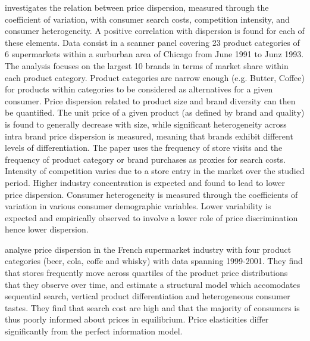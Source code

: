 \documentclass[english]{article}
\begin{document}
\cite{ZHA06} investigates the relation between price dispersion, measured through the coefficient of variation, with consumer search costs, competition intensity, and consumer heterogeneity. A positive correlation with dispersion is found for each of these elements. Data consist in a scanner panel covering 23 product categories of 6 supermarkets within a surburban area of Chicago from June 1991 to Junz 1993. The analysis focuses on the largest 10 brands in terms of market share within each product category. Product categories are narrow enough (e.g. Butter, Coffee) for products within categories to be considered as alternatives for a given consumer. Price dispersion related to product size and brand diversity can then be quantified. The unit price of a given product (as defined by brand and quality) is found to generally decrease with size, while significant heterogeneity across intra brand price dispersion is measured, meaning that brands exhibit different levels of differentiation. The paper uses the frequency of store visits and the frequency of product category or brand purchases as proxies for search costs. Intensity of competition varies due to a store entry in the market over the studied period. Higher industry concentration is expected and found to lead to lower price dispersion. Consumer heterogeneity is measured through the coefficients of variation in various consumer demographic variables. Lower variability is expected and empirically observed to involve a lower role of price discrimination hence lower dispersion.

\cite{PER15} analyse price dispersion in the French supermarket industry with four product categories (beer, cola, coffe and whisky) with data spanning 1999-2001. They find that stores frequently move across quartiles of the product price distributions that they observe over time, and estimate a structural model which accomodates sequential search, vertical product differentiation and heterogeneous consumer tastes. They find that search cost are high and that the majority of consumers is thus poorly informed about prices in equilibrium. Price elasticities differ significantly from the perfect information model.
\end{document}
